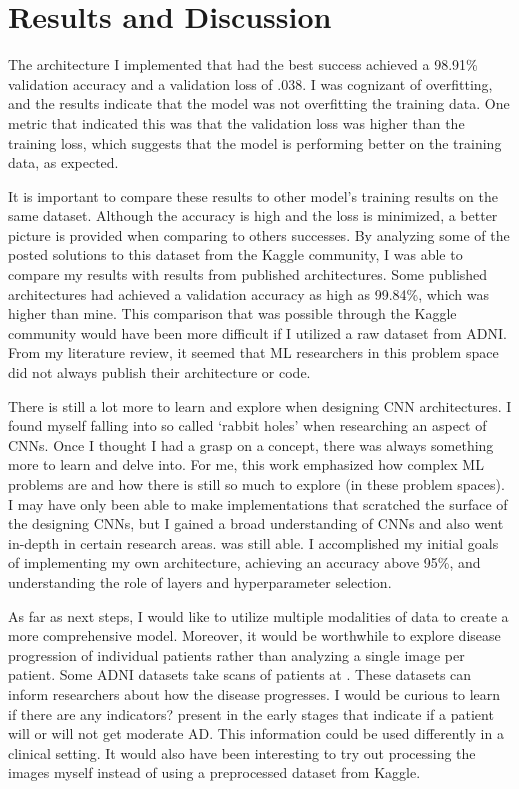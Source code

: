 \documentclass[10pt,twocolumn]{article}
\begin{document}
\section{Results and Discussion}
The architecture I implemented that had the best success achieved a 98.91\% validation accuracy and a validation loss of .038. I was cognizant of overfitting, and the results indicate that the model was not overfitting the training data. One metric that indicated this was that the validation loss was higher than the training loss, which suggests that the model is performing better on the training data, as expected.

It is important to compare these results to other model’s training results on the same dataset. Although the accuracy is high and the loss is minimized, a better picture is provided when comparing to others successes. By analyzing some of the posted solutions to this dataset from the Kaggle community, I was able to compare my results with results from published architectures. Some published architectures had achieved a validation accuracy as high as 99.84\%, which was higher than mine. This comparison that was possible through the Kaggle community would have been more difficult if I utilized a raw dataset from ADNI. From my literature review, it seemed that ML researchers in this problem space did not always publish their architecture or code. 

There is still a lot more to learn and explore when designing CNN architectures. I found myself falling into so called ‘rabbit holes’ when researching an aspect of CNNs. Once I thought I had a grasp on a concept, there was always something more to learn and delve into. For me, this work emphasized how complex ML problems are and how there is still so much to explore (in these problem spaces). I may have only been able to make implementations that scratched the surface of the designing CNNs, but I gained a broad understanding of CNNs and also went in-depth in certain research areas.  was still able. I accomplished my initial goals of implementing my own architecture, achieving an accuracy above 95\%, and understanding the role of layers and hyperparameter selection.

As far as next steps, I would like to utilize multiple modalities of data to create a more comprehensive model. Moreover, it would be worthwhile to explore disease progression of individual patients rather than analyzing a single image per patient. Some ADNI datasets take scans of patients at . These datasets can inform researchers about how the disease progresses. I would be curious to learn if there are any indicators? present in the early stages that indicate if a patient will or will not get moderate AD. This information could be used differently in a clinical setting. It would also have been interesting to try out processing the images myself instead of using a preprocessed dataset from Kaggle. 
\end{document}
